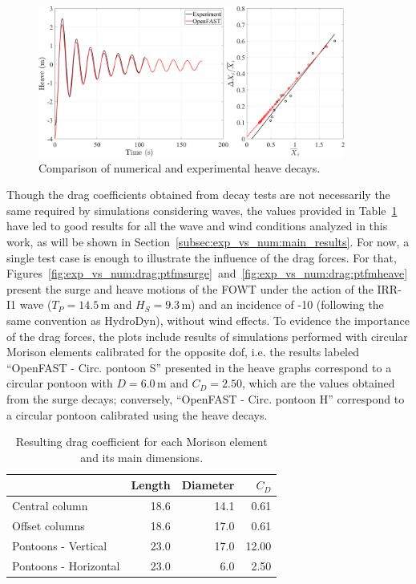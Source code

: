 \begin{figure}[!hbtp]
	\centering
	\includegraphics[width=0.9\textwidth]{./figures/heave_decay_drag_pontoon.png}%
	\caption{Comparison of numerical and experimental heave decays.} \label{fig:exp_vs_num:drag:heave_decay}%
\end{figure}%

Though the drag coefficients obtained from decay tests are not necessarily the same required by simulations considering waves, the values provided in Table~\ref{tab:exp_vs_num:drag:drag_coeffs} have led to good results for all the wave and wind conditions analyzed in this work, as will be shown in Section~\ref{subsec:exp_vs_num:main_results}. For now, a single test case is enough to illustrate the influence of the drag forces. For that, Figures~\ref{fig:exp_vs_num:drag:ptfmsurge}~and~\ref{fig:exp_vs_num:drag:ptfmheave} present the surge and heave motions of the FOWT under the action of the IRR-I1 wave ($T_P=14.5\,\text{m}$ and $H_S=9.3\,\text{m}$) and an incidence of -10\textdegree{} (following the same convention as HydroDyn), without wind effects. To evidence the importance of the drag forces, the plots include results of simulations performed with circular Morison elements calibrated for the opposite dof, i.e. the results labeled \enquote{OpenFAST - Circ. pontoon S} presented in the heave graphs correspond to a circular pontoon with $D=6.0\,\text{m}$ and $C_D=2.50$, which are the values obtained from the surge decays; conversely, \enquote{OpenFAST - Circ. pontoon H} correspond to a circular pontoon calibrated using the heave decays.

\begin{table}[!hbtp]
	\caption{Resulting drag coefficient for each Morison element and its main dimensions.}\label{tab:exp_vs_num:drag:drag_coeffs}
	\begin{tabular}{lrrr}
		\toprule
		& Length & Diameter & $C_D$ \\
		\midrule
		Central column & 18.6 & 14.1 & 0.61 \\
		Offset columns & 18.6 & 17.0 & 0.61 \\
		Pontoons - Vertical & 23.0 & 17.0 & 12.00 \\
		Pontoons - Horizontal & 23.0 & 6.0 & 2.50 \\
		\bottomrule%
\end{tabular}%
\end{table}%

